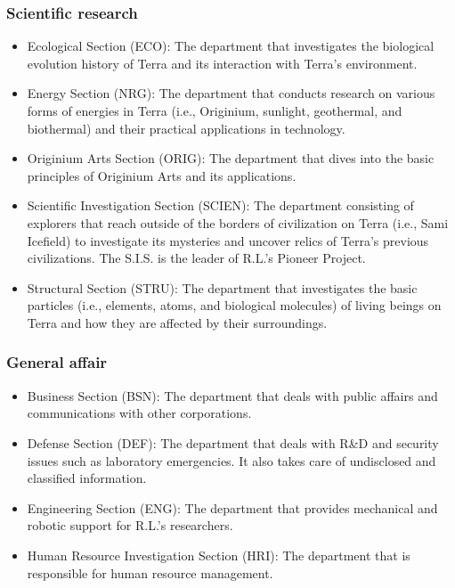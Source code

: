 \documentclass[12pt]{article}
\begin{document}
\begin{multicols}{2}
\subsubsection{Scientific research}
    \begin{itemize}
        \item Ecological Section (ECO): The department that investigates the biological evolution history of Terra and its interaction with Terra's environment.
        \item Energy Section (NRG): The department that conducts research on various forms of energies in Terra (i.e., Originium, sunlight, geothermal, and biothermal) and their practical applications in technology.
        \item Originium Arts Section (ORIG): The department that dives into the basic principles of Originium Arts and its applications.
        \item Scientific Investigation Section (SCIEN): The department consisting of explorers that reach outside of the borders of civilization on Terra (i.e., Sami Icefield) to investigate its mysteries and uncover relics of Terra's previous civilizations. The S.I.S. is the leader of R.L.'s Pioneer Project.
        \item Structural Section (STRU): The department that investigates the basic particles (i.e., elements, atoms, and biological molecules) of living beings on Terra and how they are affected by their surroundings.
    \end{itemize}

\subsubsection{General affair}
    \begin{itemize}
        \item Business Section (BSN): The department that deals with public affairs and communications with other corporations.
        \item Defense Section (DEF): The department that deals with R\&D and security issues such as laboratory emergencies. It also takes care of undisclosed and classified information.
        \item Engineering Section (ENG): The department that provides mechanical and robotic support for R.L.'s researchers.
        \item Human Resource Investigation Section (HRI): The department that is responsible for human resource management.
    \end{itemize}


\end{multicols}
\end{document}
